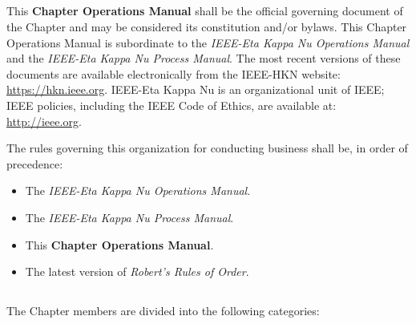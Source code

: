 \documentclass[10pt, oneside]{article}
\begin{document}
\subsection{}
This \textbf{Chapter Operations Manual} shall be the official governing document of the Chapter and may be considered its constitution and/or bylaws. This Chapter Operations Manual is subordinate to the \textit{IEEE-Eta Kappa Nu Operations Manual} and the \textit{IEEE-Eta Kappa Nu Process Manual}. The most recent versions of these documents are available electronically from the IEEE-HKN website: \url{https://hkn.ieee.org}. IEEE-Eta Kappa Nu is an organizational unit of IEEE; IEEE policies, including the IEEE Code of Ethics, are available at: \url{http://ieee.org}.

\medskip

The rules governing this organization for conducting business shall be, in order of precedence:

\begin{itemize}
    \item The \textit{IEEE-Eta Kappa Nu Operations Manual}.
    \item The \textit{IEEE-Eta Kappa Nu Process Manual}.
    \item This \textbf{Chapter Operations Manual}.
    \item The latest version of \textit{Robert’s Rules of Order}.
\end{itemize}
\subsection{}
The Chapter members are divided into the following categories:
\end{document}
